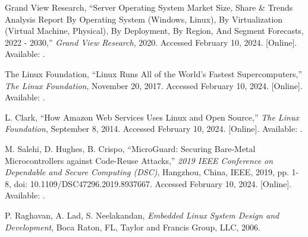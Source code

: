 \begin{thebibliography}{99}
        Grand View Research,
        ``Server Operating System Market Size, Share \& Trends Analysis Report By Operating System (Windows, Linux), By Virtualization (Virtual Machine, Physical), By Deployment, By Region, And Segment Forecasts, 2022 - 2030,''
        \textit{Grand View Research}, 2020.
        Accessed February 10, 2024.
        [Online].
        Available: .

        The Linux Foundation,
        ``Linux Runs All of the World's Fastest Supercomputers,''
        \textit{The Linux Foundation}, November 20, 2017.
        Accessed February 10, 2024.
        [Online].
        Available: .

        L. Clark,
        ``How Amazon Web Services Uses Linux and Open Source,''
        \textit{The Linux Foundation}, September 8, 2014.
        Accessed February 10, 2024.
        [Online].
        Available: .

        M. Salehi, D. Hughes, B. Crispo,
        ``MicroGuard: Securing Bare-Metal Microcontrollers against Code-Reuse Attacks,''
        \textit{2019 IEEE Conference on Dependable and Secure Computing (DSC)},
        Hangzhou, China, IEEE, 2019, pp. 1-8, doi: 10.1109/DSC47296.2019.8937667.
        Accessed February 10, 2024.
        [Online].
        Available: .

        P. Raghavan, A. Lad, S. Neelakandan,
        \textit{Embedded Linux System Design and Development},
        Boca Raton, FL, Taylor and Francis Group, LLC, 2006.

\end{thebibliography}
